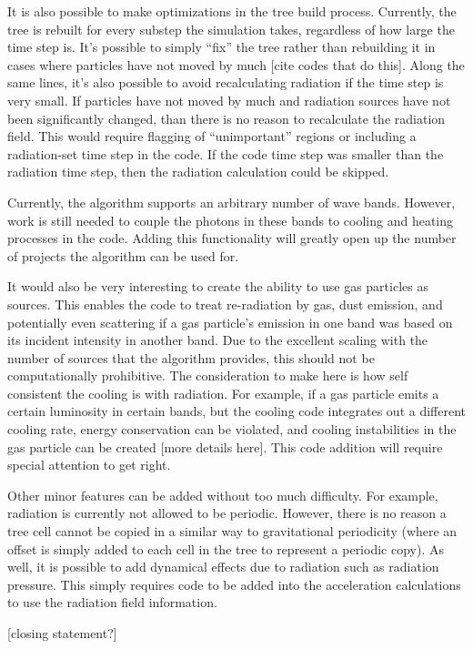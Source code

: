 It is also possible to make optimizations in the tree build process. Currently, the tree is rebuilt for every substep the simulation takes, regardless of how large the time step is. It's possible to simply ``fix'' the tree rather than rebuilding it in cases where particles have not moved by much [cite codes that do this]. Along the same lines, it's also possible to avoid recalculating radiation if the time step is very small. If particles have not moved by much and radiation sources have not been significantly changed, than there is no reason to recalculate the radiation field. This would require flagging of ``unimportant'' regions or including a radiation-set time step in the code. If the code time step was smaller than the radiation time step, then the radiation calculation could be skipped.

Currently, the algorithm supports an arbitrary number of wave bands. However, work is still needed to couple the photons in these bands to cooling and heating processes in the code. Adding this functionality will greatly open up the number of projects the algorithm can be used for.

It would also be very interesting to create the ability to use gas particles as sources. This enables the code to treat re-radiation by gas, dust emission, and potentially even scattering if a gas particle's emission in one band was based on its incident intensity in another band. Due to the excellent scaling with the number of sources that the algorithm provides, this should not be computationally prohibitive. The consideration to make here is how self consistent the cooling is with radiation. For example, if a gas particle emits a certain luminosity in certain bands, but the cooling code integrates out a different cooling rate, energy conservation can be violated, and cooling instabilities in the gas particle can be created [more details here]. This code addition will require special attention to get right.

Other minor features can be added without too much difficulty. For example, radiation is currently not allowed to be periodic. However, there is no reason a tree cell cannot be copied in a similar way to gravitational periodicity (where an offset is simply added to each cell in the tree to represent a periodic copy). As well, it is possible to add dynamical effects due to radiation such as radiation pressure. This simply requires code to be added into the acceleration calculations to use the radiation field information.

[closing statement?]